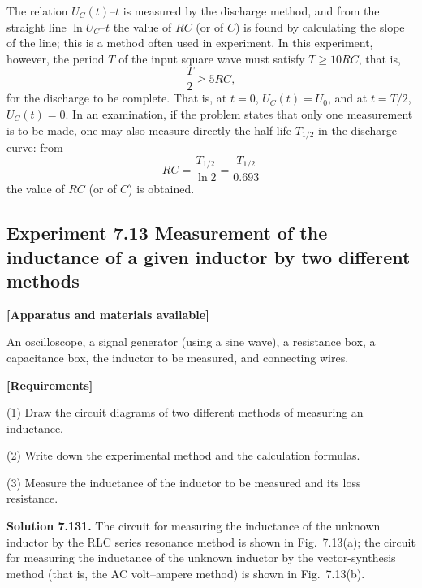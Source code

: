 \begin{commentary}
The relation $U_C(t)$--$t$ is measured by the discharge method, and from the straight line $\ln U_C$--$t$ the value of $RC$ (or of $C$) is found by calculating the slope of the line; this is a method often used in experiment. In this experiment, however, the period $T$ of the input square wave must satisfy $T\geqslant10RC$, that is,
\[
\frac{T}{2}\geqslant5RC,
\]
for the discharge to be complete. That is, at $t=0$, $U_C(t)=U_0$, and at $t=T/2$, $U_C(t)=0$. In an examination, if the problem states that only one measurement is to be made, one may also measure directly the half-life $T_{1/2}$ in the discharge curve: from
\[
RC=\frac{T_{1/2}}{\ln 2}=\frac{T_{1/2}}{0.693}
\]
the value of $RC$ (or of $C$) is obtained.
\end{commentary}

\subsection*{Experiment 7.13 \quad Measurement of the inductance of a given inductor by two different methods}

\textbf{[Apparatus and materials available]}

An oscilloscope, a signal generator (using a sine wave), a resistance box, a capacitance box, the inductor to be measured, and connecting wires.

\textbf{[Requirements]}

(1) Draw the circuit diagrams of two different methods of measuring an inductance.

(2) Write down the experimental method and the calculation formulas.

(3) Measure the inductance of the inductor to be measured and its loss resistance.

\textbf{Solution 7.13}\quad \textbf{1.} The circuit for measuring the inductance of the unknown inductor by the RLC series resonance method is shown in Fig.~7.13(a); the circuit for measuring the inductance of the unknown inductor by the vector-synthesis method (that is, the AC volt--ampere method) is shown in Fig.~7.13(b).

